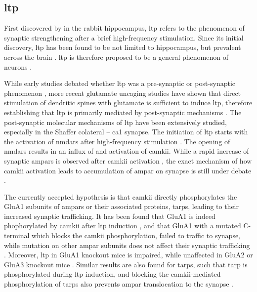 \subsection{\gls{ltp}}

First discovered by \citet{bliss73} in the rabbit hippocampus, \gls{ltp} refers to the phenomenon of synaptic strengthening after a brief high-frequency stimulation. Since its initial discovery, \gls{ltp} has been found to be not limited to hippocampus, but prevalent across the brain \citep[e.g.][]{clugnet90}. \gls{ltp} is therefore proposed to be a general phenomenon of neurons \citep{malenka04}. 

While early studies debated whether \gls{ltp} was a pre-synaptic or post-synaptic phenomenon \citep{malinow90, bekkers90, isaac95, liao95}, more recent glutamate uncaging studies have shown that direct stimulation of dendritic spines with glutamate is sufficient to induce \gls{ltp}, therefore establishing that \gls{ltp} is primarily mediated by post-synaptic mechanisms \citep{kerchner08}. The post-synaptic molecular mechanisms of \gls{ltp} have been extensively studied, especially in the Shaffer colateral -- \gls{ca1} synapse. The initiation of \gls{ltp} starts with the activation of \glspl{nmdar} after high-frequency stimulation \citep{collingridge83}. The opening of \glspl{nmdar} results in an influx of  and activation of \gls{camkii}. While a rapid increase of synaptic \glspl{ampar} is observed after \gls{camkii} activation \citep{patterson10}, the exact mechanism of how \gls{camkii} activation leads to accumulation of \gls{ampar} on synapse is still under debate \citep{herring16}. 

The currently accepted hypothesis is that \gls{camkii} directly phosphorylates the GluA1 subunits of \glspl{ampar} or their associated proteins, \glspl{tarp}, leading to their increased synaptic trafficking. It has been found that GluA1 is indeed phophorylated by \gls{camkii} after \gls{ltp} induction \citep{mcglade-mcculloh93, barria97, lee03}, and that GluA1 with a mutated C-terminal which blocks the \gls{camkii} phosphorylation, failed to traffic to synapse, while mutation on other \gls{ampar} subunits does not affect their synaptic trafficking \citep{hayashi00, shi01}. Moreover, \gls{ltp} in GluA1 knockout mice is impaired, while unaffected in GluA2 or GluA3 knockout mice \citep{zamanillo99, meng03}. Similar results are also found for \glspl{tarp}, such that \gls{tarp} is phosphorylated during \gls{ltp} induction, and blocking the \gls{camkii}-mediated phosphorylation of \glspl{tarp} also prevents \gls{ampar} translocation to the synapse \citep{tomita05, sumioka10}.

